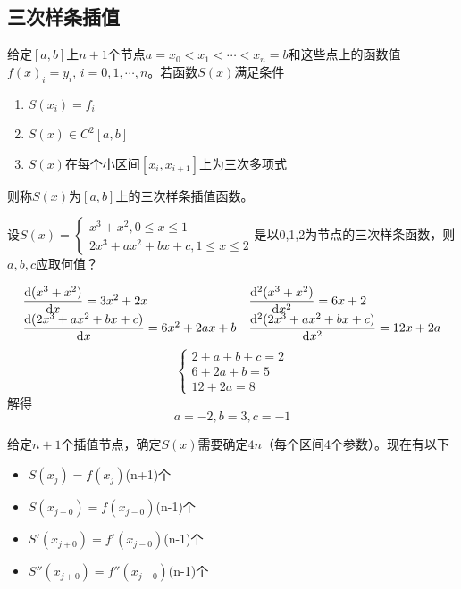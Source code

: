 \subsection{三次样条插值}
\begin{definition}[三次样条插值]
    给定$[a,b]$上$n+1$个节点$a = x_0<x_1<\cdots<x_n = b$和这些点上的函数值$f(x)_i = y_i,\,i = 0,1,\cdots,n$。若函数$S(x)$满足条件
    \begin{enumerate}
        \item $S(x_i) = f_i$
        \item $S(x)\in C^2[a,b]$
        \item $S(x)$在每个小区间$[x_i,x_{i+1}]$上为三次多项式
    \end{enumerate}
    则称$S(x)$为$[a,b]$上的三次样条插值函数。
\end{definition}
\begin{example}
    设$S(x)=\begin{cases}x^{3}+x^{2},0\leq x\leq1\\2x^{3}+ax^{2}+bx+c,1\leq x\leq2\end{cases}$是以0,1,2为节点的三次样条函数，则$a,b,c$应取何值？
    \begin{solution}
        \[
            \begin{array}{ll}
                \dfrac{\mathrm{d} (x^3+x^2)}{\mathrm{d} x} = 3x^2+2x & \dfrac{\mathrm{d}^2 (x^3+x^2)}{\mathrm{d} x^2} = 6x+2\\
                \dfrac{\mathrm{d} (2x^3+ax^2+bx+c)}{\mathrm{d} x} = 6x^2+2ax+b & \dfrac{\mathrm{d}^2 (2x^3+ax^2+bx+c)}{\mathrm{d} x^2} = 12x+2a\\
            \end{array}
        \]
        \[
            \begin{cases}
                2+a+b+c = 2\\
                6+2a+b = 5\\
                12+2a = 8
            \end{cases}
        \]
        解得
        \[
            a= -2,b = 3,c = -1
        \]
    \end{solution}
\end{example}
给定$n+1$个插值节点，确定$S(x)$需要确定\colorbox{cyan!50}{$4n$（每个区间4个参数）}。现在有以下
\begin{itemize}
    \item $S(x_{j}) = f(x_{j})$\quad (n+1)个
    \item $S(x_{j+0}) = f(x_{j-0})$\quad (n-1)个
    \item $S'(x_{j+0}) = f'(x_{j-0})$\quad (n-1)个
    \item $S''(x_{j+0}) = f''(x_{j-0})$\quad (n-1)个
\end{itemize}
